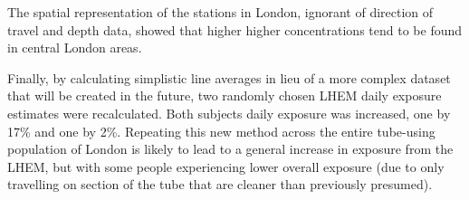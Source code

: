 
The spatial representation of the stations in London, ignorant of direction of travel and depth data, showed that higher higher concentrations tend to be found in central London areas.


Finally, by calculating simplistic line averages in lieu of a more complex dataset that will be created in the future, two randomly chosen LHEM daily exposure estimates were recalculated. Both subjects daily exposure was increased, one by 17\% and one by 2\%. Repeating this new method across the entire tube-using population of London is likely to lead to a general increase in exposure from the LHEM, but with some people experiencing lower overall exposure (due to only travelling on section of the tube that are cleaner than previously presumed).